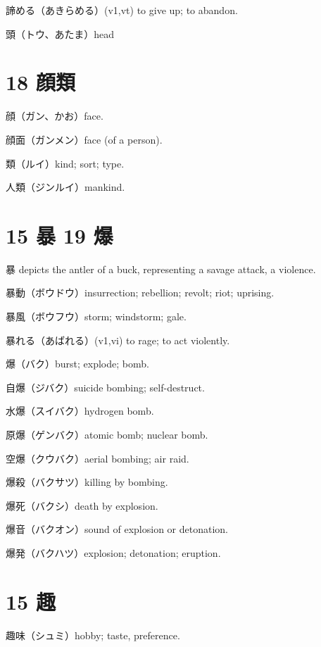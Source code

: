 諦める（あきらめる）(v1,vt)
to give up; to abandon.

頭（トウ、あたま）head

\section{18 顔類}

顔（ガン、かお）face.

顔面（ガンメン）face (of a person).

類（ルイ）kind; sort; type.

人類（ジンルイ）mankind.

\section{15 暴 19 爆}

暴 depicts the antler of a buck, representing a savage attack, a violence.

暴動（ボウドウ）insurrection; rebellion; revolt; riot; uprising.

暴風（ボウフウ）storm; windstorm; gale.

暴れる（あばれる）(v1,vi) to rage; to act violently.

爆（バク）burst; explode; bomb.

自爆（ジバク）suicide bombing; self-destruct.

水爆（スイバク）hydrogen bomb.

原爆（ゲンバク）atomic bomb; nuclear bomb.

空爆（クウバク）aerial bombing; air raid.

爆殺（バクサツ）killing by bombing.

爆死（バクシ）death by explosion.

爆音（バクオン）sound of explosion or detonation.

爆発（バクハツ）explosion; detonation; eruption.

\section{15 趣}

趣味（シュミ）hobby; taste, preference.
